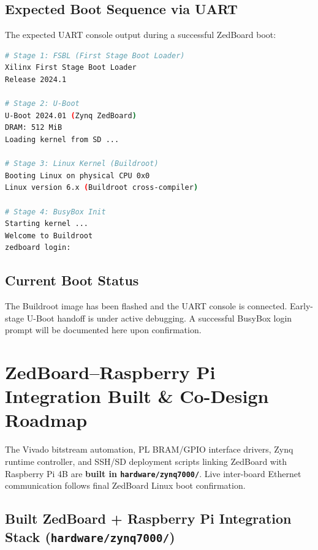 \documentclass[12pt,a4paper]{article}
\begin{document}
\subsection{Expected Boot Sequence via UART}

The expected UART console output during a successful ZedBoard boot:
\begin{lstlisting}[language=bash, caption={Expected ZedBoard boot sequence (UART output)}]
# Stage 1: FSBL (First Stage Boot Loader)
Xilinx First Stage Boot Loader
Release 2024.1

# Stage 2: U-Boot
U-Boot 2024.01 (Zynq ZedBoard)
DRAM: 512 MiB
Loading kernel from SD ...

# Stage 3: Linux Kernel (Buildroot)
Booting Linux on physical CPU 0x0
Linux version 6.x (Buildroot cross-compiler)

# Stage 4: BusyBox Init
Starting kernel ...
Welcome to Buildroot
zedboard login:
\end{lstlisting}

\subsection{Current Boot Status}

\begin{pendingbox}
The Buildroot image has been flashed and the UART console is connected. Early-stage
U-Boot handoff is under active debugging. A successful BusyBox login prompt will be
documented here upon confirmation.
\end{pendingbox}

\clearpage

\section{ZedBoard--Raspberry Pi Integration Built \& Co-Design Roadmap}

\begin{reqbox}
The Vivado bitstream automation, PL BRAM/GPIO interface drivers, Zynq runtime controller,
and SSH/SD deployment scripts linking ZedBoard with Raspberry Pi 4B are \textbf{built in
\texttt{hardware/zynq7000/}}. Live inter-board Ethernet communication follows final ZedBoard
Linux boot confirmation.
\end{reqbox}

\subsection{Built ZedBoard + Raspberry Pi Integration Stack (\texttt{hardware/zynq7000/})}
\end{document}
